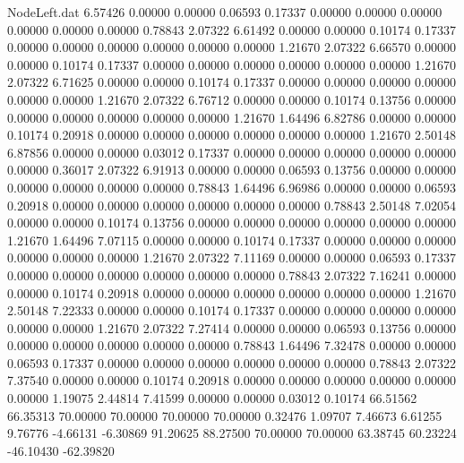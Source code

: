 \begin{filecontents}{NodeLeft.dat}
   6.57426    0.00000    0.00000     0.06593    0.17337    0.00000    0.00000    0.00000    0.00000    0.00000    0.00000    0.78843    2.07322
   6.61492    0.00000    0.00000     0.10174    0.17337    0.00000    0.00000    0.00000    0.00000    0.00000    0.00000    1.21670    2.07322
   6.66570    0.00000    0.00000     0.10174    0.17337    0.00000    0.00000    0.00000    0.00000    0.00000    0.00000    1.21670    2.07322
   6.71625    0.00000    0.00000     0.10174    0.17337    0.00000    0.00000    0.00000    0.00000    0.00000    0.00000    1.21670    2.07322
   6.76712    0.00000    0.00000     0.10174    0.13756    0.00000    0.00000    0.00000    0.00000    0.00000    0.00000    1.21670    1.64496
   6.82786    0.00000    0.00000     0.10174    0.20918    0.00000    0.00000    0.00000    0.00000    0.00000    0.00000    1.21670    2.50148
   6.87856    0.00000    0.00000     0.03012    0.17337    0.00000    0.00000    0.00000    0.00000    0.00000    0.00000    0.36017    2.07322
   6.91913    0.00000    0.00000     0.06593    0.13756    0.00000    0.00000    0.00000    0.00000    0.00000    0.00000    0.78843    1.64496
   6.96986    0.00000    0.00000     0.06593    0.20918    0.00000    0.00000    0.00000    0.00000    0.00000    0.00000    0.78843    2.50148
   7.02054    0.00000    0.00000     0.10174    0.13756    0.00000    0.00000    0.00000    0.00000    0.00000    0.00000    1.21670    1.64496
   7.07115    0.00000    0.00000     0.10174    0.17337    0.00000    0.00000    0.00000    0.00000    0.00000    0.00000    1.21670    2.07322
   7.11169    0.00000    0.00000     0.06593    0.17337    0.00000    0.00000    0.00000    0.00000    0.00000    0.00000    0.78843    2.07322
   7.16241    0.00000    0.00000     0.10174    0.20918    0.00000    0.00000    0.00000    0.00000    0.00000    0.00000    1.21670    2.50148
   7.22333    0.00000    0.00000     0.10174    0.17337    0.00000    0.00000    0.00000    0.00000    0.00000    0.00000    1.21670    2.07322
   7.27414    0.00000    0.00000     0.06593    0.13756    0.00000    0.00000    0.00000    0.00000    0.00000    0.00000    0.78843    1.64496
   7.32478    0.00000    0.00000     0.06593    0.17337    0.00000    0.00000    0.00000    0.00000    0.00000    0.00000    0.78843    2.07322
   7.37540    0.00000    0.00000     0.10174    0.20918    0.00000    0.00000    0.00000    0.00000    0.00000    0.00000    1.19075    2.44814
   7.41599    0.00000    0.00000     0.03012    0.10174   66.51562   66.35313   70.00000   70.00000   70.00000   70.00000    0.32476    1.09707
   7.46673    6.61255    9.76776    -4.66131   -6.30869   91.20625   88.27500   70.00000   70.00000   63.38745   60.23224  -46.10430  -62.39820

\end{filecontents}
